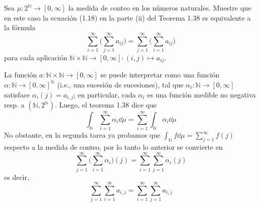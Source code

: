 \setcounter{neje}{38}
\begin{nejer}
Sea $\mu\colon 2^{\mathbb{N}} \to [0, \infty]$ la medida de conteo en los números naturales. Muestre que en este caso la ecuación (1.18) en la parte (ii) del Teorema 1.38 es equivalente a la fórmula
$$
\sum_{i=1}^{\infty} \Bigg( \sum_{j=1}^{\infty} a_{ij} \Bigg) = \sum_{j=1}^{\infty} \Bigg( \sum_{i=1}^{\infty} a_{ij} \Bigg)
$$
para cada aplicación $\mathbb{N} \times \mathbb{N} \to [0, \infty]: (i, j) \mapsto a_{ij}$.
\end{nejer}
\begin{sol}
La función $a \colon \mathbb{N} \times\mathbb{N} \to [0,\infty]$ se puede interpretar como una función $\alpha \colon \mathbb{N} \to [0,\infty]^\mathbb{N}$ (i.e., una sucesión de sucesiones), tal que $\alpha_i \colon \mathbb{N} \to [0,\infty]$ satisface $\alpha_i(j) = a_{i,j}$; en particular, cada $\alpha_i$ es una función medible no negativa resp. a $(\mathbb{N},2^\mathbb{N})$. Luego, el teorema 1.38 dice que
\[
\int_\mathbb{N} \sum^\infty_{i=1}\alpha_i \dd{\mu} = \sum^\infty_{i=1} \int_\mathbb{N}\alpha_i \dd{\mu}
\]
No obstante, en la segunda tarea ya probamos que $\int_\mathbb{N}f \dd{\mu} = \sum^\infty_{j=1} f(j)$ respecto a la medida de conteo, por lo tanto lo anterior se convierte en
\[
\sum^\infty_{j=1} \biggl(\sum^\infty_{i=1}\alpha_i \biggr)(j) = \sum^\infty_{i=1} \sum^\infty_{j=1}\alpha_i(j)
\]
es decir,
\[
\sum^\infty_{j=1} \sum^\infty_{i=1} a_{i,j} = \sum^\infty_{i=1} \sum^\infty_{j=1} a_{i,j}
\]
\end{sol}